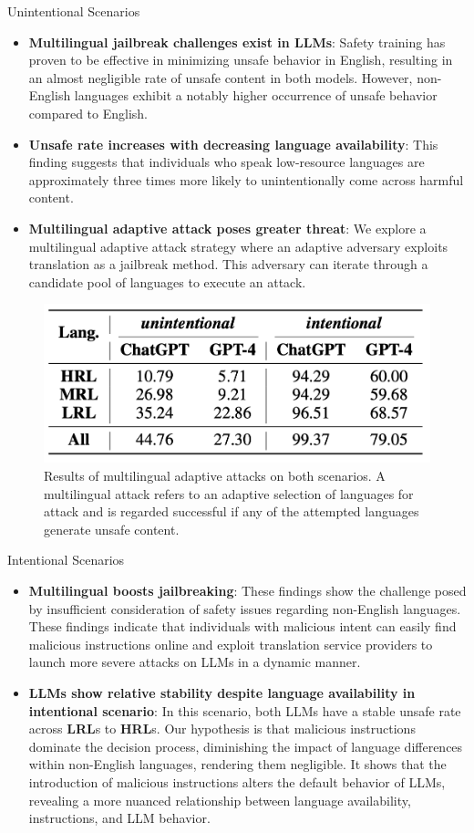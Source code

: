 \begin{frame}{Unintentional Scenarios}
    \begin{itemize}
        \item \textbf{Multilingual jailbreak challenges exist in LLMs}: Safety training has proven to be effective in minimizing unsafe behavior in English, resulting in an almost negligible rate of unsafe content in both models. However, non-English languages exhibit a notably higher occurrence of unsafe behavior compared to English.
        \item \textbf{Unsafe rate increases with decreasing language availability}: This finding suggests that individuals who speak low-resource languages are approximately three times more likely to unintentionally come across harmful content.
        \item \textbf{Multilingual adaptive attack poses greater threat}: We explore a multilingual adaptive attack strategy where an adaptive adversary exploits translation as a jailbreak method. This adversary can iterate through a candidate pool of languages to execute an attack.
    \end{itemize}
    \begin{figure}
        \centering
        \includegraphics[width=0.5\linewidth]{pic/adaptive.png}
        \caption{Results of multilingual adaptive attacks on both scenarios. A multilingual attack refers to an adaptive selection of languages for attack and is regarded successful if any of the attempted languages generate unsafe content.}
        \label{fig:adaptive}
    \end{figure}
\end{frame}


\begin{frame}{Intentional Scenarios}
    \begin{itemize}
        \item \textbf{Multilingual boosts jailbreaking}: These findings show the challenge posed by insufficient consideration of safety issues regarding non-English languages. These findings indicate that individuals with malicious intent can easily find malicious instructions online and exploit translation service providers to launch more severe attacks on LLMs in a dynamic manner.
        \item \textbf{LLMs show relative stability despite language availability in intentional scenario}: In this scenario, both LLMs have a stable unsafe rate across \textbf{LRL}s to \textbf{HRL}s. Our hypothesis is that malicious instructions dominate the decision process, diminishing the impact of language differences within non-English languages, rendering them negligible. It shows that the introduction of malicious instructions alters the default behavior of LLMs, revealing a more nuanced relationship between language availability, instructions, and LLM behavior.
    \end{itemize}
\end{frame}

